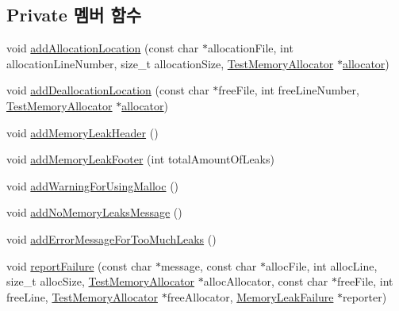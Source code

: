 \subsection*{Private 멤버 함수}
\begin{DoxyCompactItemize}
\item 
void \hyperlink{class_memory_leak_output_string_buffer_a5f6e2b7ab5d4600d3a3c829c1ec6faa7}{add\+Allocation\+Location} (const char $\ast$allocation\+File, int allocation\+Line\+Number, size\+\_\+t allocation\+Size, \hyperlink{class_test_memory_allocator}{Test\+Memory\+Allocator} $\ast$\hyperlink{_memory_leak_warning_test_8cpp_a83fc2e9b9142613f7df2bcc3ff8292bc}{allocator})
\item 
void \hyperlink{class_memory_leak_output_string_buffer_acae4e17ec89e44eb6767751248d5cdb3}{add\+Deallocation\+Location} (const char $\ast$free\+File, int free\+Line\+Number, \hyperlink{class_test_memory_allocator}{Test\+Memory\+Allocator} $\ast$\hyperlink{_memory_leak_warning_test_8cpp_a83fc2e9b9142613f7df2bcc3ff8292bc}{allocator})
\item 
void \hyperlink{class_memory_leak_output_string_buffer_af2e1dc56c3bf80241f576a81ff02dd60}{add\+Memory\+Leak\+Header} ()
\item 
void \hyperlink{class_memory_leak_output_string_buffer_a8ae585bb2ebf4a57a7414d855eb877fe}{add\+Memory\+Leak\+Footer} (int total\+Amount\+Of\+Leaks)
\item 
void \hyperlink{class_memory_leak_output_string_buffer_a57d7e9800c9f156619ea03a7cca303d8}{add\+Warning\+For\+Using\+Malloc} ()
\item 
void \hyperlink{class_memory_leak_output_string_buffer_a4fb8c9f82dfd44fc7ec4c313b847b902}{add\+No\+Memory\+Leaks\+Message} ()
\item 
void \hyperlink{class_memory_leak_output_string_buffer_a0259a6c52dc5b5530e4cab9383bea68c}{add\+Error\+Message\+For\+Too\+Much\+Leaks} ()
\item 
void \hyperlink{class_memory_leak_output_string_buffer_ae3d2ba0fc07468c3ac05c87be80caf55}{report\+Failure} (const char $\ast$message, const char $\ast$alloc\+File, int alloc\+Line, size\+\_\+t alloc\+Size, \hyperlink{class_test_memory_allocator}{Test\+Memory\+Allocator} $\ast$alloc\+Allocator, const char $\ast$free\+File, int free\+Line, \hyperlink{class_test_memory_allocator}{Test\+Memory\+Allocator} $\ast$free\+Allocator, \hyperlink{class_memory_leak_failure}{Memory\+Leak\+Failure} $\ast$reporter)
\end{DoxyCompactItemize}
